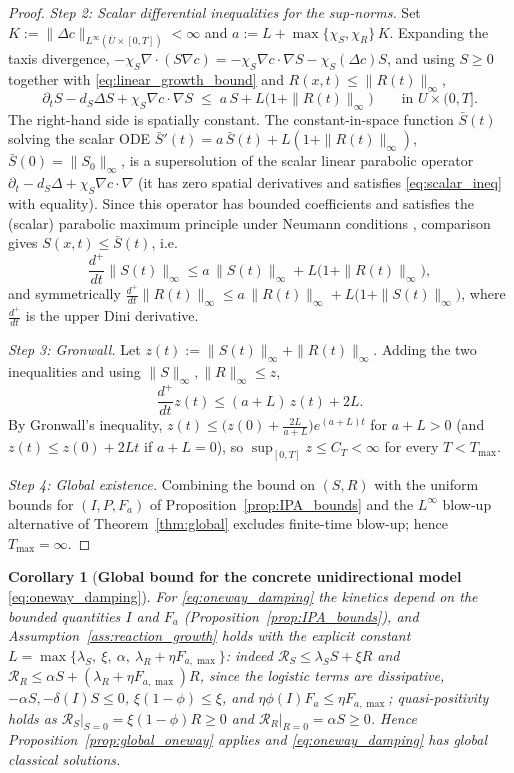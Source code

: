 \documentclass[pdflatex,sn-mathphys-ay]{sn-jnl}
\theoremstyle{thmstyleone}
\newtheorem{corollary}[theorem]{Corollary}
\theoremstyle{definition}
\theoremstyle{remark}
\begin{document}
\begin{appendices}
\begin{proof}
\emph{Step 2: Scalar differential inequalities for the sup-norms.} Set
$K:=\|\Delta c\|_{L^\infty(\overline U\times[0,T])}<\infty$ and
$a:=L+\max\{\chi_S,\chi_R\}\,K$. Expanding the taxis divergence,
$-\chi_S\nabla\!\cdot(S\nabla c)=-\chi_S\nabla c\!\cdot\!\nabla S-\chi_S(\Delta c)S$,
and using $S\ge0$ together with \eqref{eq:linear_growth_bound} and
$R(x,t)\le\|R(t)\|_\infty$,
\begin{equation}
\label{eq:scalar_ineq}
\partial_t S-d_S\Delta S+\chi_S\nabla c\!\cdot\!\nabla S
\;\le\;a\,S+L\bigl(1+\|R(t)\|_\infty\bigr)\qquad\text{in }U\times(0,T].
\end{equation}
The right-hand side is spatially constant. The constant-in-space function
$\bar S(t)$ solving the scalar ODE
$\bar S'(t)=a\,\bar S(t)+L(1+\|R(t)\|_\infty)$, $\bar S(0)=\|S_0\|_\infty$, is a
supersolution of the scalar linear parabolic operator
$\partial_t-d_S\Delta+\chi_S\nabla c\!\cdot\!\nabla$ (it has zero spatial
derivatives and satisfies \eqref{eq:scalar_ineq} with equality). Since this
operator has bounded coefficients and satisfies the (scalar) parabolic maximum
principle under Neumann conditions \citep{protter2012maximum,ladyzenskaia1968linear}, comparison
gives $S(x,t)\le\bar S(t)$, i.e.
\[
\frac{d^+}{dt}\|S(t)\|_\infty\le a\,\|S(t)\|_\infty+L\bigl(1+\|R(t)\|_\infty\bigr),
\]
and symmetrically
$\frac{d^+}{dt}\|R(t)\|_\infty\le a\,\|R(t)\|_\infty+L\bigl(1+\|S(t)\|_\infty\bigr)$,
where $\tfrac{d^+}{dt}$ is the upper Dini derivative.

\emph{Step 3: Gronwall.} Let $z(t):=\|S(t)\|_\infty+\|R(t)\|_\infty$. Adding the two
inequalities and using $\|S\|_\infty,\|R\|_\infty\le z$,
\[
\frac{d^+}{dt}z(t)\le (a+L)\,z(t)+2L .
\]
By Gronwall's inequality, $z(t)\le \bigl(z(0)+\tfrac{2L}{a+L}\bigr)e^{(a+L)t}$ for
$a+L>0$ (and $z(t)\le z(0)+2Lt$ if $a+L=0$), so
$\sup_{[0,T]}z\le C_T<\infty$ for every $T<T_{\max}$.

\emph{Step 4: Global existence.} Combining the bound on $(S,R)$ with the uniform
bounds for $(I,P,F_a)$ of Proposition~\ref{prop:IPA_bounds} and the $L^\infty$
blow-up alternative of Theorem~\ref{thm:global} excludes finite-time blow-up;
hence $T_{\max}=\infty$.
\end{proof}

\begin{corollary}[\textbf{Global bound for the concrete unidirectional model} \eqref{eq:oneway_damping}]
\label{cor:global_oneway_concrete}
For \eqref{eq:oneway_damping} the kinetics depend on the bounded quantities $I$ and
$F_a$ (Proposition~\ref{prop:IPA_bounds}), and Assumption~\ref{ass:reaction_growth}
holds with the explicit constant
$L=\max\{\lambda_S,\ \xi,\ \alpha,\ \lambda_R+\eta F_{a,\max}\}$: indeed
$\mathcal R_S\le\lambda_S S+\xi R$ and $\mathcal R_R\le\alpha S+(\lambda_R+\eta F_{a,\max})R$,
since the logistic terms are dissipative, $-\alpha S,-\delta(I)S\le0$,
$\xi(1-\phi)\le\xi$, and $\eta\phi(I)F_a\le\eta F_{a,\max}$; quasi-positivity holds as
$\mathcal R_S|_{S=0}=\xi(1-\phi)R\ge0$ and $\mathcal R_R|_{R=0}=\alpha S\ge0$. Hence
Proposition~\ref{prop:global_oneway} applies and \eqref{eq:oneway_damping} has
global classical solutions.
\end{corollary}


\end{appendices}
\end{document}
